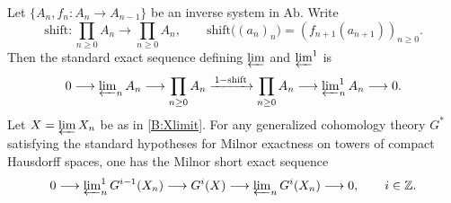 \documentclass[11pt]{article}
\theoremstyle{remark}
\begin{document}
Let $\{A_n,f_n:A_n\to A_{n-1}\}$ be an inverse system in $\mathrm{Ab}$.
Write
\begin{equation}
\mathrm{shift}:\prod_{n\ge 0}A_n\to \prod_{n\ge 0}A_n,\qquad
\mathrm{shift}\bigl((a_n)_n\bigr)=(f_{n+1}(a_{n+1}))_{n\ge 0}.
\label{B:shift}
\end{equation}
Then the standard exact sequence defining $\varprojlim$ and $\varprojlim^{1}$ is
\begin{equation}
0\longrightarrow \varprojlim\nolimits_{n}A_n
\longrightarrow \prod_{n\ge 0}A_n
\xrightarrow{\,1-\mathrm{shift}\,}
\prod_{n\ge 0}A_n
\longrightarrow \varprojlim\nolimits^{1}_{n}A_n
\longrightarrow 0.
\label{B:lim1def}
\end{equation}
Let $X=\varprojlim X_n$ be as in \eqref{B:Xlimit}. For any generalized cohomology theory $G^\ast$ satisfying the standard hypotheses for Milnor exactness on towers of compact Hausdorff spaces, one has the Milnor short exact sequence
\begin{equation}
0\longrightarrow \varprojlim\nolimits^{1}_{n} G^{i-1}(X_n)
\longrightarrow G^{i}(X)
\longrightarrow \varprojlim\nolimits_{n}G^{i}(X_n)
\longrightarrow 0,
\qquad i\in\mathbb{Z}.
\label{B:milnorG}
\end{equation}
\end{document}
